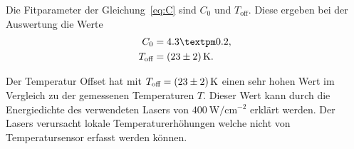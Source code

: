Die Fitparameter der Gleichung~\ref{eq:C} sind $C_0$ und $T_\text{off}$.
Diese ergeben bei der Auswertung die Werte 
\begin{align}
    C_0 & = 4.3 ± 0.2, \\
    T_\text{off} & = \SI{ 23 \pm 2}{\kelvin}.
\end{align}

Der Temperatur Offset hat mit $T_\text{off} = \SI{ 23 \pm 2}{\kelvin}$ einen sehr hohen Wert
im Vergleich zu der gemessenen Temperaturen $T$.
Dieser Wert kann durch die Energiedichte des verwendeten Lasers von $\SI{400}{\watt\per\centi\meter^{-2}}$
erklärt werden.
Der Lasers verursacht lokale Temperaturerhöhungen welche nicht 
von Temperatursensor erfasst werden können.
